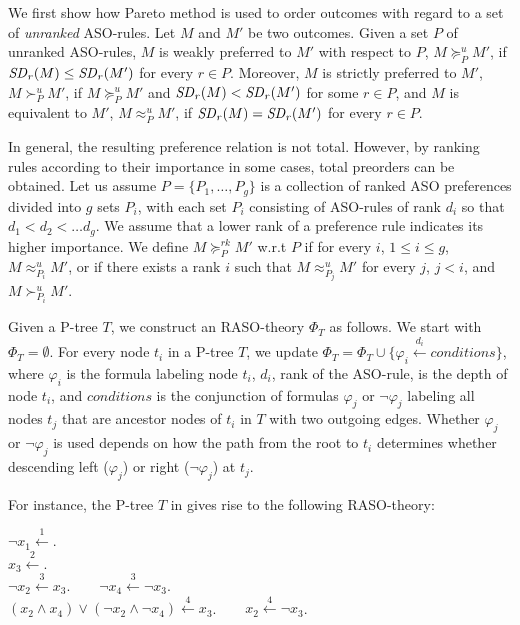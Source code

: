 We first show how Pareto method is used to order outcomes with regard
to a set of \emph{unranked} ASO-rules. Let $M$ and $M'$ be two outcomes.  
Given a set $P$ of unranked ASO-rules, $M$ is weakly preferred to $M'$ 
with respect to $P$, $M \succeq^u_P M'$, if $\mathit{SD}_r(M) \leq \mathit{SD}_r(M')$ 
for every $r \in P$. Moreover, $M$ is strictly preferred to $M'$, $M 
\succ^u_P M'$, if $M \succeq^u_P M'$ and $\mathit{SD}_r(M) < \mathit{SD}_r(M')$ for some 
$r \in P$, and $M$ is equivalent to $M'$, $M \approx^u_P M'$,
if $\mathit{SD}_r(M) = \mathit{SD}_r(M')$ for every $r \in P$.

In general, the resulting preference relation is not total. However, by 
ranking rules according to their importance in some cases, total preorders
can be obtained. Let us assume $P=\{P_1,\ldots,P_g\}$ is a collection of 
ranked ASO preferences divided into $g$ sets $P_i$, with each set $P_i$ 
consisting 
of ASO-rules of rank $d_i$ so that $d_1 < d_2<\ldots d_g$. We assume that 
a lower rank of a preference
rule indicates its higher importance.
We define $M 
\succeq^{rk}_P M'$ w.r.t $P$ if for every $i$, $1\leq i\leq g$, 
$M \approx^u_{P_i} M'$, or if there exists a rank $i$ such that 
$M \approx^u_{P_j} M'$ for every $j$, $j< i$, and $M \succ^u_{P_i} M'$.

Given a P-tree $T$, we construct an RASO-theory $\Phi_T$ as follows.
We start with $\Phi_T=\emptyset$.
For every node $t_i$ in a P-tree $T$, we update
$\Phi_T=\Phi_T \cup \{\varphi_i \overset{d_i}{\leftarrow} conditions\}$,
where $\varphi_i$ is the formula labeling node $t_i$,
$d_i$, rank of the ASO-rule, is the depth of node $t_i$,
and $conditions$ is the conjunction
of formulas $\varphi_j$ or $\neg \varphi_j$ labeling all nodes $t_j$
that are ancestor nodes of $t_i$ in $T$ with two outgoing edges.
Whether $\varphi_j$ or $\neg \varphi_j$ is used depends on how the path 
from the root to
$t_i$ determines whether descending left ($\varphi_j$) or right ($\neg \varphi_j$)
at $t_j$.

For instance, the P-tree $T$ in  gives rise to the following RASO-theory:

	\begin{framed}
		\noindent $\neg x_1 \overset{1}{\leftarrow}$.  \\%
		$x_3 \overset{2}{\leftarrow}$.\\
		$\neg x_2 \overset{3}{\leftarrow} x_3$.  $\;\;\;\;\;$
		$\neg x_4 \overset{3}{\leftarrow} \neg x_3$.\\
		$(x_2 \land x_4) \lor (\neg x_2 \land \neg x_4) \overset{4}{\leftarrow} x_3$. $\;\;\;\;\;$
		$x_2 \overset{4}{\leftarrow} \neg x_3$.
	\end{framed}

